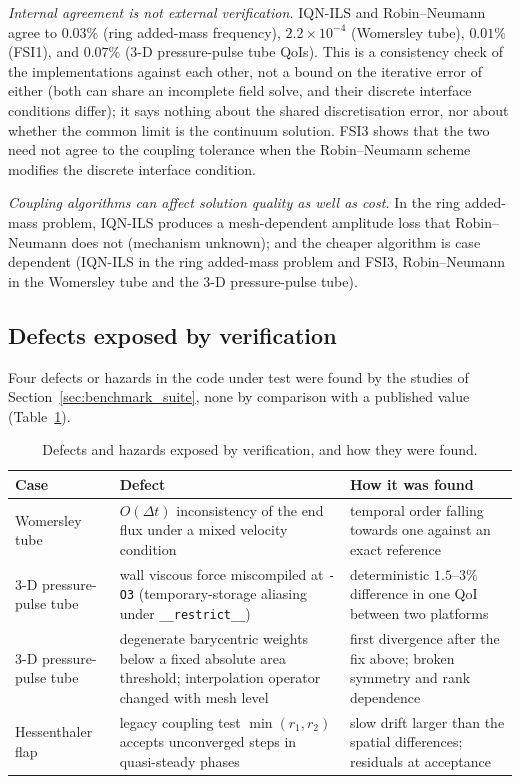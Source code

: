 \emph{Internal agreement is not external verification.}
IQN-ILS and Robin--Neumann agree to $0.03\%$ (ring added-mass frequency), $2.2\times10^{-4}$ (Womersley tube), $0.01\%$ (FSI1), and $0.07\%$ (3-D pressure-pulse tube QoIs).
This is a consistency check of the implementations against each other, not a bound on the iterative error of either (both can share an incomplete field solve, and their discrete interface conditions differ); it says nothing about the shared discretisation error, nor about whether the common limit is the continuum solution.
FSI3 shows that the two need not agree to the coupling tolerance when the Robin--Neumann scheme modifies the discrete interface condition.

\emph{Coupling algorithms can affect solution quality as well as cost.}
In the ring added-mass problem, IQN-ILS produces a mesh-dependent amplitude loss that Robin--Neumann does not (mechanism unknown); and the cheaper algorithm is case dependent (IQN-ILS in the ring added-mass problem and FSI3, Robin--Neumann in the Womersley tube and the 3-D pressure-pulse tube).


\subsection{Defects exposed by verification}\label{sec:defects}

Four defects or hazards in the code under test were found by the studies of Section~\ref{sec:benchmark_suite}, none by comparison with a published value (Table~\ref{tab:defects}).

\begin{table}[htbp]
	\centering
	\footnotesize
	\setlength{\tabcolsep}{3pt}
	\caption{Defects and hazards exposed by verification, and how they were found.}
	\label{tab:defects}
	\begin{tabular}{p{2.6cm}p{5.6cm}p{5.6cm}}
		\toprule
		Case & Defect & How it was found \\
		\midrule
		Womersley tube & $O(\Delta t)$ inconsistency of the end flux under a mixed velocity condition & temporal order falling towards one against an exact reference \\
		3-D pressure-pulse tube & wall viscous force miscompiled at \texttt{-O3} (temporary-storage aliasing under \texttt{\_\_restrict\_\_}) & deterministic $1.5$--$3\%$ difference in one QoI between two platforms \\
		3-D pressure-pulse tube & degenerate barycentric weights below a fixed absolute area threshold; interpolation operator changed with mesh level & first divergence after the fix above; broken symmetry and rank dependence \\
		Hessenthaler flap & legacy coupling test $\min(r_1, r_2)$ accepts unconverged steps in quasi-steady phases & slow drift larger than the spatial differences; residuals at acceptance \\
		\bottomrule
	\end{tabular}
\end{table}

